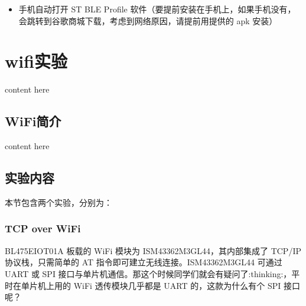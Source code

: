 \documentclass[a4paper,12pt,english]{sphinxmanual}
\begin{document}
\begin{sphinxVerbatim}[commandchars=\\\{\}]
\PYG{p}{[}\PYG{p}{]}
\end{sphinxVerbatim}
\begin{itemize}
\item {} 
\sphinxAtStartPar
手机自动打开 ST BLE Profile 软件（要提前安装在手机上，如果手机没有，会跳转到谷歌商城下载，考虑到网络原因，请提前用提供的 apk 安装）

\end{itemize}



\sphinxstepscope


\section{wifi实验}
\label{\detokenize{exp-stm32/wifi/index:wifi}}\label{\detokenize{exp-stm32/wifi/index::doc}}
\sphinxAtStartPar
content here


\subsection{WiFi简介}
\label{\detokenize{exp-stm32/wifi/index:id1}}
\sphinxAtStartPar
content here


\subsection{实验内容}
\label{\detokenize{exp-stm32/wifi/index:id2}}
\sphinxAtStartPar
本节包含两个实验，分别为：

\sphinxstepscope


\subsubsection{TCP over WiFi}
\label{\detokenize{exp-stm32/wifi/tcp-over-wifi:tcp-over-wifi}}\label{\detokenize{exp-stm32/wifi/tcp-over-wifi::doc}}
\sphinxAtStartPar
B\sphinxhyphen{}L475E\sphinxhyphen{}IOT01A 板载的 WiFi 模块为 ISM43362\sphinxhyphen{}M3G\sphinxhyphen{}L44，其内部集成了 TCP/IP 协议栈，只需简单的 AT 指令即可建立无线连接。ISM43362\sphinxhyphen{}M3G\sphinxhyphen{}L44 可通过 UART 或 SPI 接口与单片机通信。那这个时候同学们就会有疑问了:thinking:，平时在单片机上用的 WiFi 透传模块几乎都是 UART 的，这款为什么有个 SPI 接口呢？
\end{document}
